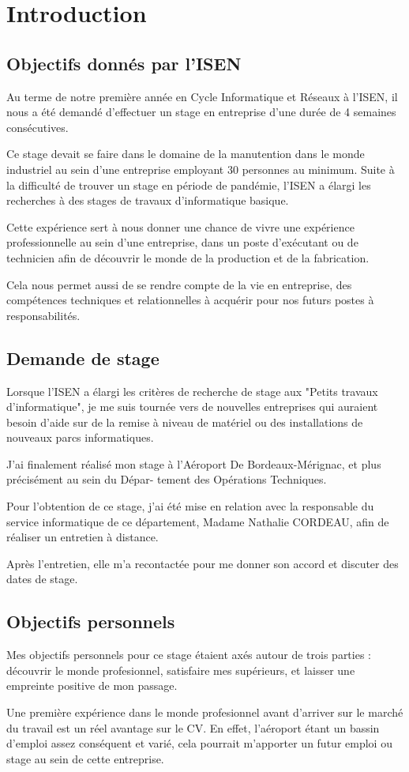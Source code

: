 \chapter{Introduction}

\section{Objectifs donnés par l'ISEN}


Au terme de notre première année en Cycle Informatique et Réseaux à l’ISEN, il nous a été demandé
d’effectuer un stage en entreprise d’une durée de 4 semaines consécutives.


Ce stage devait se faire dans le domaine de la manutention dans le monde industriel au sein d’une entreprise
employant 30 personnes au minimum. Suite à la difficulté de trouver un stage en période de pandémie, l’ISEN a élargi les recherches à
des stages de travaux d’informatique basique.


Cette expérience sert à nous donner une chance de vivre une expérience professionnelle au sein d’une
entreprise, dans un poste d’exécutant ou de technicien afin de découvrir le monde de la production et de la
fabrication.


Cela nous permet aussi de se rendre compte de la vie en entreprise, des compétences techniques et
relationnelles à acquérir pour nos futurs postes à responsabilités.


\section{Demande de stage}

Lorsque l’ISEN a élargi les critères de recherche de stage aux "Petits travaux d’informatique", je me suis
tournée vers de nouvelles entreprises qui auraient besoin d’aide sur de la remise à niveau de matériel ou des
installations de nouveaux parcs informatiques.


J’ai finalement réalisé mon stage à l’Aéroport De Bordeaux-Mérignac, et plus précisément au sein du Dépar-
tement des Opérations Techniques.


Pour l’obtention de ce stage, j’ai été mise en relation avec la responsable du service informatique de ce
département, Madame Nathalie CORDEAU, afin de réaliser un entretien à distance.

Après l’entretien, elle m'a recontactée pour me donner son accord et discuter des dates de stage.


\section{Objectifs personnels}

Mes objectifs personnels pour ce stage étaient axés autour de trois parties : découvrir le monde profesionnel,
satisfaire mes supérieurs, et laisser une empreinte positive de mon passage.


Une première expérience dans le monde profesionnel avant d’arriver sur le marché du travail est un réel
avantage sur le CV. En effet, l’aéroport étant un bassin d’emploi assez conséquent et varié, cela pourrait
m’apporter un futur emploi ou stage au sein de cette entreprise.